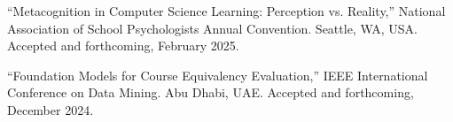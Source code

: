 \documentclass[hidelinks, 10.5pt]{article}
\def\contentwidth{0.9\linewidth}    %
\def\contentspacing{2.5mm}          %
\def\sectionspacing{8mm}            %
\def\sectiontocontentspacing{4mm}   %
\renewcommand{\section}[1]{
    {\fontsize{14}{14}\selectfont \textsc{\textbf{\ \ #1\ \ }}}\hrulefill
}
\begin{document}
{\vspace{\sectiontocontentspacing}

\begin{minipage}[ct]{\contentwidth}
    ``Metacognition in Computer Science Learning: Perception vs. Reality,'' National Association of School Psychologists Annual Convention.
    Seattle, WA, USA. Accepted and forthcoming, February 2025.
\end{minipage}

\vspace{\contentspacing}

\begin{minipage}[ct]{\contentwidth}
    ``Foundation Models for Course Equivalency Evaluation,'' IEEE International Conference on Data Mining.  Abu Dhabi, UAE.  Accepted and
    forthcoming, December 2024.
\end{minipage}

\vspace{\sectionspacing}











}
\end{document}
